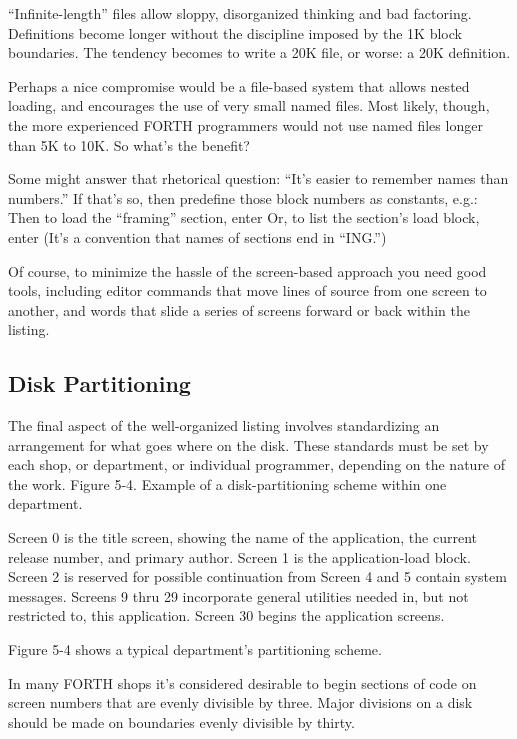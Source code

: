 ``Infinite-length'' files allow sloppy, disorganized thinking and bad
factoring.  Definitions become longer without the discipline imposed by
the 1K block boundaries.  The tendency becomes to write a 20K file, or
worse: a 20K definition.

Perhaps a nice compromise would be a file-based system that allows
nested loading, and encourages the use of very small named files.  Most
likely, though, the more experienced FORTH programmers would not
use named files longer than 5K to 10K.  So what's the benefit?

Some might answer that rhetorical question: ``It's easier to remember
names than numbers.'' If that's so, then predefine those block
numbers as constants, e.g.:
Then to load the ``framing'' section, enter
Or, to list the section's load block, enter
(It's a convention that names of sections end in ``ING.'')

Of course, to minimize the hassle of the screen-based approach you
need good tools, including editor commands that move lines of source
from one screen to another, and words that slide a series of screens forward
or back within the listing.

\subsection{Disk Partitioning}

The final aspect of the well-organized listing involves standardizing an
arrangement for what goes where on the disk.  These standards must be
set by each shop, or department, or individual programmer, depending on
the nature of the work.
Figure 5-4. Example of a disk-partitioning scheme within one department.

Screen 0 is the title screen, showing the name of the
    application, the current release number, and primary
    author.
Screen 1 is the application-load block.
Screen 2 is reserved for possible continuation from
Screen 4 and 5 contain system messages.
Screens 9 thru 29 incorporate general utilities needed
    in, but not restricted to, this application.
Screen 30 begins the application screens.

Figure 5-4 shows a typical department's partitioning scheme.

In many FORTH shops it's considered desirable to begin sections of
code on screen numbers that are evenly divisible by three.  Major divisions
on a disk should be made on boundaries evenly divisible by thirty.

